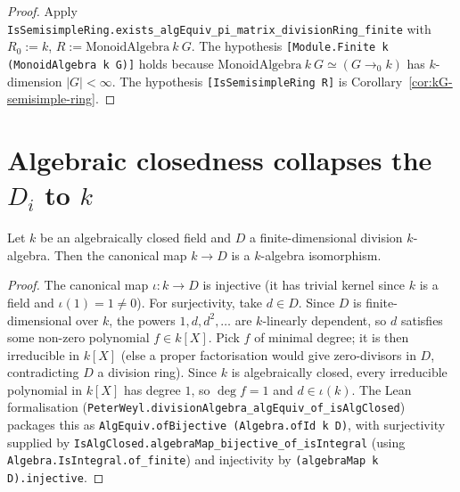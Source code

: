 \begin{proof}\leanok
  Apply
  \texttt{IsSemisimpleRing.exists\_algEquiv\_pi\_matrix\_divisionRing\_finite}
  with $R_0 := k$, $R := \mathrm{MonoidAlgebra}\ k\ G$. The hypothesis
  \texttt{[Module.Finite k (MonoidAlgebra k G)]} holds because
  $\mathrm{MonoidAlgebra}\ k\ G \simeq (G \to_{\!0\!} k)$ has $k$-dimension
  $|G| < \infty$. The hypothesis \texttt{[IsSemisimpleRing R]} is
  Corollary~\ref{cor:kG-semisimple-ring}.
\end{proof}

\section{Algebraic closedness collapses the $D_i$ to $k$}

\begin{lemma}
  \label{lem:divalg-of-isAlgClosed}
  \leanok
  Let $k$ be an algebraically closed field and $D$ a finite-dimensional
  division $k$-algebra. Then the canonical map $k \to D$ is a $k$-algebra
  isomorphism.
\end{lemma}

\begin{proof}
  \leanok
  The canonical map $\iota : k \to D$ is injective (it has trivial kernel
  since $k$ is a field and $\iota(1) = 1 \ne 0$). For surjectivity, take
  $d \in D$. Since $D$ is finite-dimensional over $k$, the powers
  $1, d, d^2, \ldots$ are $k$-linearly dependent, so $d$ satisfies some non-zero
  polynomial $f \in k[X]$. Pick $f$ of minimal degree; it is then irreducible
  in $k[X]$ (else a proper factorisation would give zero-divisors in $D$,
  contradicting $D$ a division ring). Since $k$ is algebraically closed,
  every irreducible polynomial in $k[X]$ has degree $1$, so $\deg f = 1$ and
  $d \in \iota(k)$. The Lean formalisation
  (\texttt{PeterWeyl.divisionAlgebra\_algEquiv\_of\_isAlgClosed}) packages this
  as \texttt{AlgEquiv.ofBijective (Algebra.ofId k D)}, with surjectivity
  supplied by \texttt{IsAlgClosed.algebraMap\_bijective\_of\_isIntegral} (using
  \texttt{Algebra.IsIntegral.of\_finite}) and injectivity by
  \texttt{(algebraMap k D).injective}.
\end{proof}

